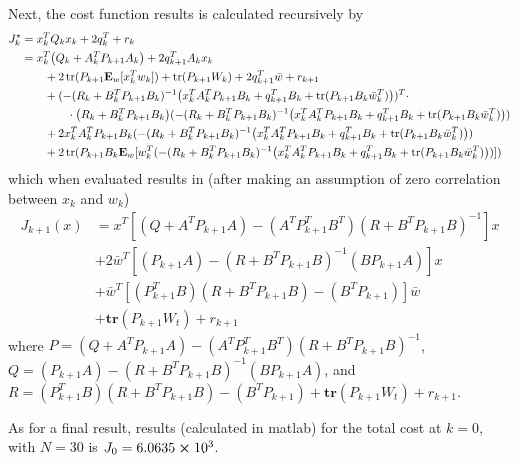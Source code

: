 \documentclass[]{article}
\begin{document}
Next, the cost function results is calculated recursively by
\begin{align*}
    J_{k}^{\star} &= x_k^T Q_k x_k + 2 q_k^T + r_k\\
    &= x_k^T \qty(Q_k + A_k^T P_{k+1} A_k)
    + 2 q_{k+1}^T A_k x_k
    \\ & \qquad
    + 2 \trace(P_{k+1} \vb{E}_w[x_k^T w_k])
    + \trace(P_{k+1} W_k)
    + 2 q_{k+1}^T \bar{w}
    + r_{k+1}
    \\ & \qquad 
    + (-(R_k + B_k^T P_{k+1} B_k)^{-1} \qty(
        x_k^T A_k^T P_{k+1} B_k
        + q_{k+1}^T B_k
        + \trace(P_{k+1} B_k \bar{w}_k^T)
    ))^T \cdot
    \\ & \qquad \qquad
    \cdot \qty(R_k + B_k^T P_{k+1} B_k) (-(R_k + B_k^T P_{k+1} B_k)^{-1} \qty(
        x_k^T A_k^T P_{k+1} B_k
        + q_{k+1}^T B_k
        + \trace(P_{k+1} B_k \bar{w}_k^T)
    ))
    \\ & \qquad 
    + 2 x_k^T A_k^T P_{k+1} B_k (-(R_k + B_k^T P_{k+1} B_k)^{-1} \qty(
        x_k^T A_k^T P_{k+1} B_k
        + q_{k+1}^T B_k
        + \trace(P_{k+1} B_k \bar{w}_k^T)
    ))
    \\ & \qquad 
    + 2 \trace(P_{k+1} B_k \vb{E}_w[w_k^T (-(R_k + B_k^T P_{k+1} B_k)^{-1} \qty(x_k^T A_k^T P_{k+1} B_k
        + q_{k+1}^T B_k
        + \trace(P_{k+1} B_k \bar{w}_k^T)
    ))])
\end{align*}
which when evaluated results in (after making an assumption of zero correlation between $x_k$ and $w_k$) \[
    \begin{split}
        J_{k+1}(x)
        &=  x^T[(Q+A^TP_{k+1}A)-(A^TP_{k+1}^TB^T)(R+B^TP_{k+1}B)^{-1}]x\\
        &+  2\bar{w}^T[(P_{k+1}A)-(R+B^TP_{k+1}B)^{-1}(BP_{k+1}A)]x\\
        &+ \bar{w}^T[(P_{k+1}^TB)(R+B^TP_{k+1}B)-(B^TP_{k+1})]\bar{w}\\
        &+ \mathbf{tr}(P_{k+1}W_t) + r_{k+1}
    \end{split}    
\]
where 
\(P = (Q+A^TP_{k+1}A)-(A^TP_{k+1}^TB^T)(R+B^TP_{k+1}B)^{-1}\), 
\(Q = (P_{k+1}A)-(R+B^TP_{k+1}B)^{-1}(BP_{k+1}A)\), 
and \(R = (P_{k+1}^TB)(R+B^TP_{k+1}B)-(B^TP_{k+1}) + \mathbf{tr}(P_{k+1}W_t) + r_{k+1}\).



As for a final result, results (calculated in matlab) for the total cost at $k=0$, with $N = 30$ is $J_0 = 6.0635\cross 10^3$.








\appendix
% 
% 

\newpage

\end{document}
